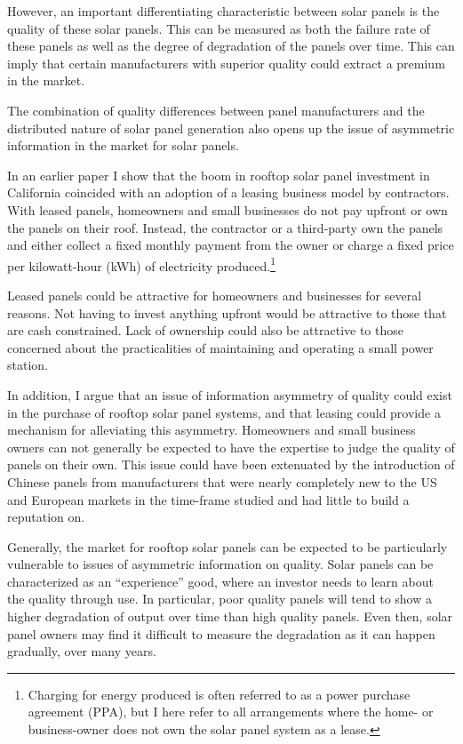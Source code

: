 \documentclass[12pt]{article}
\begin{document}
However, an important differentiating characteristic between solar panels is the quality of these solar panels. This can be measured as both the failure rate of these panels as well as the degree of degradation of the panels over time. This can imply that certain manufacturers with superior quality could extract a premium in the market.

The combination of quality differences between panel manufacturers and the distributed nature of solar panel generation also opens up the issue of asymmetric information in the market for solar panels.

In an earlier paper \citep{mauritzen_whats_2015} I show that the boom in rooftop solar panel investment in California coincided with an adoption of a leasing business model by contractors. With leased panels, homeowners and small businesses do not pay upfront or own the panels on their roof. Instead, the contractor or a third-party own the panels and either collect a fixed monthly payment from the owner or charge a fixed price per kilowatt-hour (kWh) of electricity produced.\footnote{Charging for energy produced is often referred to as a power purchase agreement (PPA), but I here refer to all arrangements where the home- or business-owner does not own the solar panel system as a lease.}

Leased panels could be attractive for homeowners and businesses for several reasons. Not having to invest anything upfront would be attractive to those that are cash constrained. Lack of ownership could also be attractive to those concerned about the practicalities of maintaining and operating a small power station.

In addition, I argue that an issue of information asymmetry of quality could exist in the purchase of rooftop solar panel systems, and that leasing could provide a mechanism for alleviating this asymmetry. Homeowners and small business owners can not generally be expected to have the expertise to judge the quality of panels on their own. This issue could have been extenuated by the introduction of Chinese panels from manufacturers that were nearly completely new to the US and European markets in the time-frame studied and had little to build a reputation on.

Generally, the market for rooftop solar panels can be expected to be particularly vulnerable to issues of asymmetric information on quality. Solar panels can be characterized as an ``experience'' good, where an investor needs to learn about the quality through use. In particular, poor quality panels will tend to show a higher degradation of output over time than high quality panels. Even then, solar panel owners may find it difficult to measure the degradation as it can happen gradually, over many years.
\end{document}
